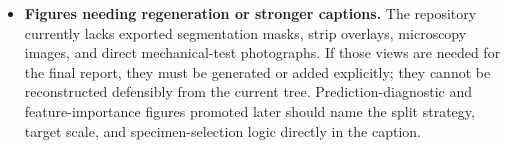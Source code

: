 \documentclass[main.tex]{subfiles}
\begin{document}
\begin{itemize}
    \item \textbf{Figures needing regeneration or stronger captions.} The repository currently lacks exported segmentation masks, strip overlays, microscopy images, and direct mechanical-test photographs. If those views are needed for the final report, they must be generated or added explicitly; they cannot be reconstructed defensibly from the current tree. Prediction-diagnostic and feature-importance figures promoted later should name the split strategy, target scale, and specimen-selection logic directly in the caption.
\end{itemize}
\end{document}

